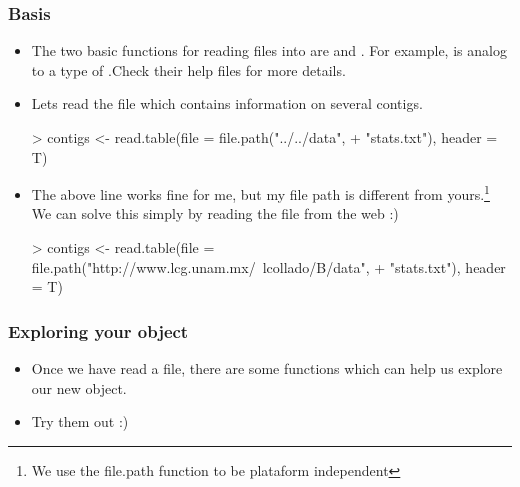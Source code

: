\begin{frame}
  \frametitle{Basis}
  \begin{itemize}
  \item The two basic functions for reading files into  are  and . For example,  is analog to a type of .Check their help files for more details.
  \item Lets read the  file which contains information on several contigs.
  \scriptsize
\begin{Schunk}
\begin{Sinput}
> contigs <- read.table(file = file.path("../../data", 
+     "stats.txt"), header = T)
\end{Sinput}
\end{Schunk}
  \item \normalsize The above line works fine for me, but my file path is different from yours.\footnote{We use the file.path function to be plataform independent} We can solve this simply by reading the file from the web :) 
  \scriptsize 
\begin{Schunk}
\begin{Sinput}
> contigs <- read.table(file = file.path("http://www.lcg.unam.mx/~lcollado/B/data", 
+     "stats.txt"), header = T)
\end{Sinput}
\end{Schunk}
\normalsize
  \end{itemize}
\end{frame}

\begin{frame}
  \frametitle{Exploring your object}
  \begin{itemize}
  \item Once we have read a file, there are some functions which can help us explore our new object.
  \item Try them out :)
\begin{Schunk}
\end{Schunk}
  \end{itemize}
\end{frame}

